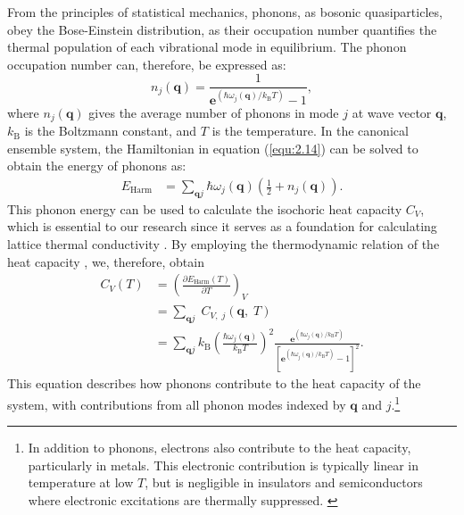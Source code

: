 From the principles of statistical mechanics, phonons, as bosonic quasiparticles, obey the Bose-Einstein distribution, as their occupation number quantifies the thermal population of each vibrational mode in equilibrium.
The phonon occupation number can, therefore, be expressed as:
\begin{equation}
\label{equ:2.15}
       n_{j}(\mathbf{q}) = \frac{1}{\mathbf{e}^{\left(\hbar\omega_{j}(\mathbf{q})/k_{\text{B}}T\right)}-1},
\end{equation}
where $n_{j}(\mathbf{q})$ gives the average number of phonons in mode $j$ at wave vector $\mathbf{q}$, $k_{\text{B}}$ is the Boltzmann constant, and $T$ is the temperature.
In the canonical ensemble system, the Hamiltonian in equation (\ref{equ:2.14}) can be solved to obtain the energy of phonons as:
\begin{equation}
\label{equ:2.16}
    \begin{split}
       E_{\text{Harm}} &= \sum_{\mathbf{q}j}\hbar\omega_{j}(\mathbf{q})\left(\frac{1}{2}+n_{j}(\mathbf{q})\right).
    \end{split}
\end{equation}
This phonon energy can be used to calculate the isochoric heat capacity $C_{V}$, which is essential to our research since it serves as a foundation for calculating lattice thermal conductivity \cite{Togo2015}.
By employing the thermodynamic relation of the heat capacity \cite{dove_2005},
we, therefore, obtain 
\begin{equation}
\label{equ:2.17}
    \begin{split} 
   C_{V}(T)  & = \left( \frac{\partial E_{\text{Harm}}(T)}{\partial T} \right)_V\\
       &= \sum_{\mathbf{q}j}\;C_{V,\;j}(\mathbf{q},\;T)\\
       &=\sum_{\mathbf{q}j}k_{\text{B}}\left(\frac{\hbar\omega_{j}(\mathbf{q})}{k_{\text{B}}T}\right)^{2}\frac{\mathbf{e}^{\left(\hbar\omega_{j}(\mathbf{q})/k_{\text{B}}T\right)}}{\left[ \mathbf{e}^{\left(\hbar\omega_{j}(\mathbf{q})/k_{\text{B}}T\right)}-1 \right]^{2}}.
    \end{split}
\end{equation}
This equation describes how phonons contribute to the heat capacity of the system, with contributions from all phonon modes indexed by $\mathbf{q}$ and $j$.\footnote{In addition to phonons, electrons also contribute to the heat capacity, particularly in metals. This electronic contribution is typically linear in temperature at low \( T \), but is negligible in insulators and semiconductors where electronic excitations are thermally suppressed. \cite{ashcroft_mermin}}

